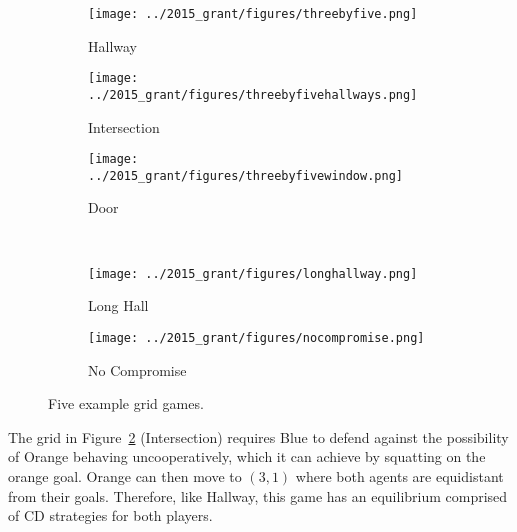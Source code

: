 \begin{figure}
\centering
\begin{subfigure}{.3\textwidth}
\centering
\texttt{[image: ../2015\_grant/figures/threebyfive.png]}
\caption{Hallway}
\label{fig:hallway}
\end{subfigure}
\begin{subfigure}{.3\textwidth}
\centering
\texttt{[image: ../2015\_grant/figures/threebyfivehallways.png]}
\caption{Intersection}
\label{fig:intersection}
\end{subfigure}
\begin{subfigure}{.3\textwidth}
\centering
\texttt{[image: ../2015\_grant/figures/threebyfivewindow.png]}
\caption{Door}
\label{fig:door}
\end{subfigure} \\ [2.5ex]
\begin{subfigure}{.367\textwidth}
\centering
\texttt{[image: ../2015\_grant/figures/longhallway.png]}
\caption{Long Hall}
\label{fig:longhallway}
\end{subfigure}
\begin{subfigure}{.367\textwidth}
\centering
\texttt{[image: ../2015\_grant/figures/nocompromise.png]}
\caption{No Compromise}
\label{fig:nocompromise}
\end{subfigure}
\caption{Five example grid games.}
\end{figure}

The grid in Figure~\ref{fig:intersection} (Intersection) requires Blue
to defend against the possibility of Orange behaving uncooperatively,
which it can achieve by squatting on the orange goal.  Orange can then
move to $(3,1)$ where both agents are equidistant from their goals.
Therefore, like Hallway, this game has an equilibrium comprised of CD strategies
for both players.  

